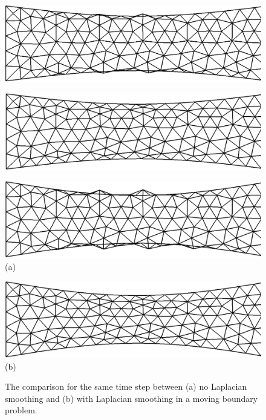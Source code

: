 \begin{figure}[H]
\begin{minipage}{.50\linewidth}
     \end{minipage}\\[7pt]
     \begin{minipage}{.50\linewidth}
      \centering
      \includegraphics[scale=0.19]{./02_chaps/cap_numerico/figure/no3.png}\\
     \end{minipage}%
     \begin{minipage}{.50\linewidth}
      \centering
      \includegraphics[scale=0.19]{./02_chaps/cap_numerico/figure/with3.png}\\
     \end{minipage}
     \begin{minipage}{.50\linewidth}
     \medskip
      \centering
      \includegraphics[scale=0.19]{./02_chaps/cap_numerico/figure/no4.png}\\
     (a)
     \end{minipage}%
     \begin{minipage}{.50\linewidth}
     \medskip
      \centering
      \includegraphics[scale=0.19]{./02_chaps/cap_numerico/figure/with4.png}\\
     (b)
     \end{minipage}
     \medskip
     \caption{
The comparison for the same time step between 
     (a) no Laplacian smoothing and
     (b) with Laplacian smoothing
in a moving boundary problem.
}
     \label{laplacian smoothing fig}
\end{figure}



